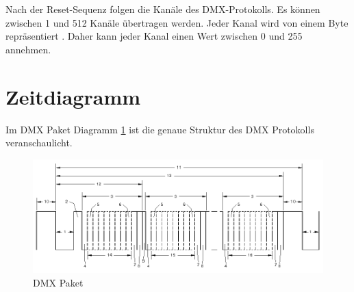 Nach der Reset-Sequenz folgen die Kanäle des DMX-Protokolls. Es können zwischen 1 und 512 Kanäle übertragen werden. Jeder Kanal wird von einem Byte repräsentiert \cite[p.10]{DMX512-Protocol-Standard}. Daher kann jeder Kanal einen Wert zwischen 0 und 255 annehmen.

\section{Zeitdiagramm}

Im DMX Paket Diagramm \ref{fig:DmxTimingFrame} ist die  genaue Struktur des DMX Protokolls veranschaulicht.

\begin{figure}[H]
	\centering
	\includegraphics[width=\linewidth]{Pictures/DmxTimingFrame}
	
	\caption{DMX Paket \cite[S.17]{DMX512-Protocol-Standard}}
	\label{fig:DmxTimingFrame}
\end{figure}

